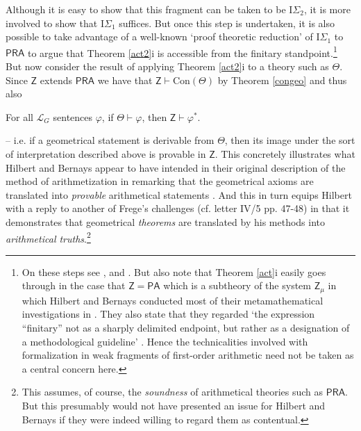 \documentclass[11pt,fleqn,leqno]{article}
\def\phi{\varphi}
\def\proves{\vdash}
\begin{document}
Although it is easy to show that this fragment can be taken to be $\mathrm{I}\Sigma_2$, it is more involved to show that $\mathrm{I}\Sigma_1$ suffices.   But once this step is undertaken, it is also possible to take advantage of a well-known `proof theoretic reduction' of $\mathrm{I}\Sigma_1$ to $\mathsf{PRA}$ to argue that Theorem \ref{act2}i is accessible from the finitary standpoint.\footnote{On these steps see \citep{Dean2019a}, \citep[\S I.4b]{Hajek1998} and \citep{Feferman1988}.   But also note that Theorem \ref{act}i easily goes through in the case that $\mathsf{Z} = \mathsf{PA}$ which is a subtheory of the system $\mathsf{Z}_{\mu}$ in which Hilbert and Bernays conducted most of their metamathematical investigations in \citeyearpar{Hilbert1939}.  They also state that they regarded `the expression ``finitary'' not as a sharply delimited endpoint, but rather as a designation of a methodological guideline' \citeyearpar[p. 347]{Hilbert1939}.  Hence the technicalities involved with formalization in weak fragments of first-order arithmetic need not be taken as a central concern here.}  But now consider the result of applying Theorem \ref{act2}i to a theory such as $\Theta$.   Since $\mathsf{Z}$ extends $\mathsf{PRA}$ we have that $\mathsf{Z} \proves \mathrm{Con}(\Theta)$ by Theorem \ref{congeo} and thus also
\begin{example}  For all $\mathcal{L}_G$ sentences $\phi$, if $\Theta \proves \phi$, then $\mathsf{Z} \proves \phi^*$.
\end{example}
-- i.e. if a geometrical statement is derivable from $\Theta$, then its image under the sort of interpretation described above is provable in $\mathsf{Z}$.   This concretely illustrates what Hilbert and Bernays appear to have intended in their original description of the method of arithmetization in remarking that the geometrical axioms are translated into \textsl{provable} arithmetical statements \citeyearpar[p. 3]{Hilbert1934}.   And this in turn equips Hilbert with a reply to another of Frege's challenges (cf. letter IV/5 pp. 47-48) in that it demonstrates that geometrical \textsl{theorems} are translated by his methods into  \textsl{arithmetical truths}.\footnote{This assumes, of course, the \textsl{soundness} of arithmetical theories such as $\mathsf{PRA}$.   But this presumably would not have presented an issue for Hilbert and Bernays if they were indeed willing to regard them as contentual.} 
\end{document}

